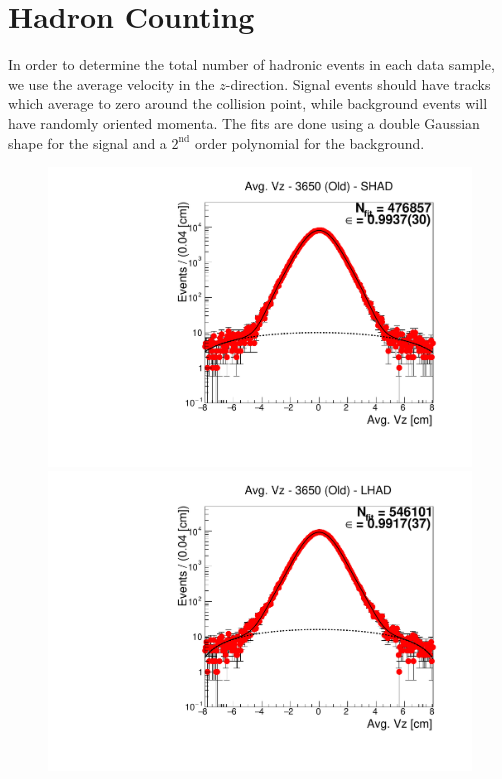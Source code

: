 \section{Hadron Counting}
\label{sec:hadron_counting}

In order to determine the total number of hadronic events in each data sample, we use the average velocity in the $z$-direction.
Signal events should have tracks which average to zero around the collision point, while background events will have randomly oriented momenta.
The fits are done using a double Gaussian shape for the signal and a $2^{\text{nd}}$ order polynomial for the background.

\begin{figure}[H]
\centering
\includegraphics[scale=0.25]{figures/plots/nonDDbar_fit_results/3650_old/fit_old_3650_data_SHAD.pdf}
\hspace{-0.5cm}
\includegraphics[scale=0.25]{figures/plots/nonDDbar_fit_results/3650_old/fit_old_3650_data_LHAD.pdf}

\end{figure}
